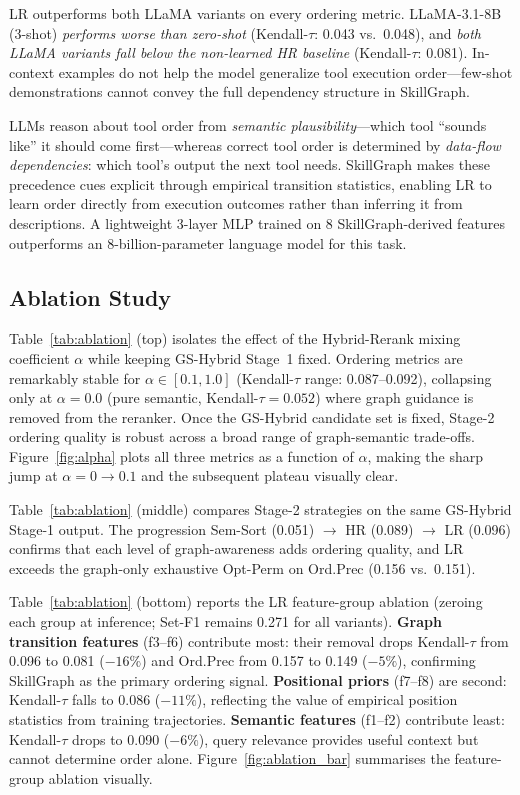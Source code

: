 \documentclass[lettersize,journal]{IEEEtran}
\begin{document}
LR outperforms both LLaMA variants on every ordering metric.
LLaMA-3.1-8B (3-shot) \emph{performs worse than zero-shot} (Kendall-$\tau$: 0.043 vs.\ 0.048), and \emph{both LLaMA variants fall below the non-learned HR baseline} (Kendall-$\tau$: 0.081).
In-context examples do not help the model generalize tool execution order---few-shot demonstrations cannot convey the full dependency structure in SkillGraph.

LLMs reason about tool order from \emph{semantic plausibility}---which tool ``sounds like'' it should come first---whereas correct tool order is determined by \emph{data-flow dependencies}: which tool's output the next tool needs.
SkillGraph makes these precedence cues explicit through empirical transition statistics, enabling LR to learn order directly from execution outcomes rather than inferring it from descriptions.
A lightweight 3-layer MLP trained on 8 SkillGraph-derived features outperforms an 8-billion-parameter language model for this task.

\subsection{Ablation Study}



Table~\ref{tab:ablation} (top) isolates the effect of the Hybrid-Rerank mixing coefficient $\alpha$ while keeping GS-Hybrid Stage~1 fixed.
Ordering metrics are remarkably stable for $\alpha \in [0.1, 1.0]$ (Kendall-$\tau$ range: 0.087--0.092), collapsing only at $\alpha = 0.0$ (pure semantic, Kendall-$\tau = 0.052$) where graph guidance is removed from the reranker.
Once the GS-Hybrid candidate set is fixed, Stage-2 ordering quality is robust across a broad range of graph-semantic trade-offs.
Figure~\ref{fig:alpha} plots all three metrics as a function of $\alpha$, making the sharp jump at $\alpha{=}0{\to}0.1$ and the subsequent plateau visually clear.



Table~\ref{tab:ablation} (middle) compares Stage-2 strategies on the same GS-Hybrid Stage-1 output.
The progression Sem-Sort (0.051) $\to$ HR (0.089) $\to$ LR (0.096) confirms that each level of graph-awareness adds ordering quality, and LR exceeds the graph-only exhaustive Opt-Perm on Ord.Prec (0.156 vs.\ 0.151).

Table~\ref{tab:ablation} (bottom) reports the LR feature-group ablation (zeroing each group at inference; Set-F1 remains 0.271 for all variants).
\textbf{Graph transition features} (f3--f6) contribute most: their removal drops Kendall-$\tau$ from 0.096 to 0.081 ($-16\%$) and Ord.Prec from 0.157 to 0.149 ($-5\%$), confirming SkillGraph as the primary ordering signal.
\textbf{Positional priors} (f7--f8) are second: Kendall-$\tau$ falls to 0.086 ($-11\%$), reflecting the value of empirical position statistics from training trajectories.
\textbf{Semantic features} (f1--f2) contribute least: Kendall-$\tau$ drops to 0.090 ($-6\%$), query relevance provides useful context but cannot determine order alone.
Figure~\ref{fig:ablation_bar} summarises the feature-group ablation visually.
\end{document}

